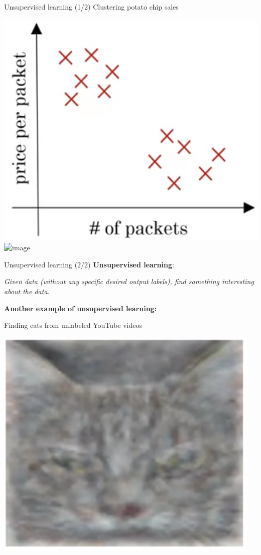 \documentclass[pdf]{beamer}
\theoremstyle{mystyle}
\begin{document}
\begin{frame}{Unsupervised learning (1/2)}
	Clustering potato chip sales
	\begin{center}
		\includegraphics[scale=.25]{potato-chip-sales} \qquad \includegraphics<2->[scale=.25]{potato-chip-sales-2}
	\end{center}
	
\end{frame}

\begin{frame}{Unsupervised learning (2/2)}
	\textbf{Unsupervised learning}:
	\begin{center}
		\textit{Given data (without any specific desired output labels), find something interesting about the data.}
	\end{center}
	
	\textbf{Another example of unsupervised learning:}
	
	\bigskip	
	
	\pause Finding cats from unlabeled YouTube videos
	\begin{center}
		\includegraphics[scale=.25]{google-cats}
	\end{center}	
\end{frame}
\end{document}
